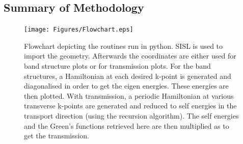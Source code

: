 \subsection{Summary of Methodology}
\begin{figure}
    \centering
    \texttt{[image: Figures/Flowchart.eps]}
    \caption{Flowchart depicting the routines run in python. SISL is used to import the geometry. Afterwards the coordinates are either used for band structure plots or for transmission plots. For the band structures, a Hamiltonian at each desired k-point is generated and diagonalised in order to get the eigen energies. These energies are then plotted. With transmission, a periodic Hamiltonian at various transverse k-points are generated and reduced to self energies in the transport direction (using the recursion algorithm). The self energies and the Green's functions retrieved here are then multiplied as to get the transmission.}
    \label{Flowchart}
\end{figure}
